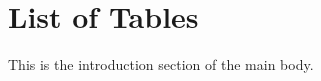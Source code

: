 

\section*{List of Tables} \label{list-of-tables}

This is the introduction section of the main body.
